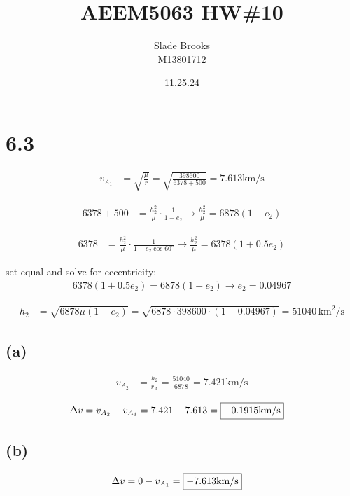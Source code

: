 \documentclass[12 pt]{article}
\title{AEEM5063 HW\#10}
\date{11.25.24}
\author{Slade Brooks \\ M13801712}
\begin{document}
\maketitle

\section*{6.3}
\begin{align*}
    v_{A_1} &= \sqrt{\frac{\mu}{r}} = \sqrt{\frac{398600}{6378 + 500}} = 7.613 \text{km/s}
\end{align*}

\begin{align*}
    6378 + 500 &= \frac{h_2^2}{\mu} \cdot \frac{1}{1 - e_2} \rightarrow \frac{h_2^2}{\mu} = 6878 (1 - e_2)
\end{align*}

\begin{align*}
    6378 &= \frac{h_2^2}{\mu} \cdot \frac{1}{1 + e_2 \cos 60^\circ} \rightarrow \frac{h_2^2}{\mu} = 6378 (1 + 0.5e_2)
\end{align*}

set equal and solve for eccentricity:
\begin{align*}
    6378(1 + 0.5e_2) = 6878(1 - e_2) \rightarrow e_2 = 0.04967
\end{align*}

\begin{align*}
    h_2 &= \sqrt{6878 \mu (1 - e_2)} = \sqrt{6878 \cdot 398600 \cdot (1 - 0.04967)} = 51040 \, \text{km}^2/\text{s}
\end{align*}

\subsection*{(a)}
\begin{align*}
    v_{A_2} &= \frac{h_2}{r_A} = \frac{51040}{6878} = 7.421 \text{km/s}
\end{align*}

\begin{align*}
    \Delta v &= v_{A_2} - v_{A_1} = 7.421 - 7.613 = \fbox{$-0.1915 \text{km/s}$}
\end{align*}

\subsection*{(b)}
\begin{align*}
    \Delta v &= 0 - v_{A_1} = \fbox{$-7.613 \text{km/s}$}
\end{align*} 
\end{document}
